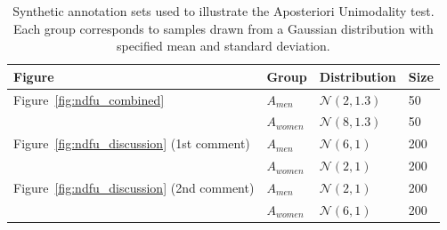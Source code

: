 \documentclass{article}
\begin{document}
\begin{table}[ht]
\centering
\begin{tabular}{|l|l|l|l|}
\hline
\textbf{Figure} & \textbf{Group} & \textbf{Distribution} & \textbf{Size} \\
\hline
Figure~\ref{fig:ndfu_combined}
  & $A_{men}$   & $\mathcal{N}(2, 1.3)$  & 50 \\
  & $A_{women}$ & $\mathcal{N}(8, 1.3)$  & 50 \\
\hline
Figure~\ref{fig:ndfu_discussion} (1st comment)
  & $A_{men}$   & $\mathcal{N}(6, 1)$  & 200 \\
  & $A_{women}$ & $\mathcal{N}(2, 1)$  & 200 \\
\hline
Figure~\ref{fig:ndfu_discussion} (2nd comment) 
  & $A_{men}$   & $\mathcal{N}(2, 1)$  & 200 \\
  & $A_{women}$ & $\mathcal{N}(6, 1)$  & 200 \\
\hline
\end{tabular}
\caption{Synthetic annotation sets used to illustrate the Aposteriori Unimodality test. Each group corresponds to samples drawn from a Gaussian distribution with specified mean and standard deviation.}
\label{tab:synthetic_annotation_sets}
\end{table}
\end{document}

